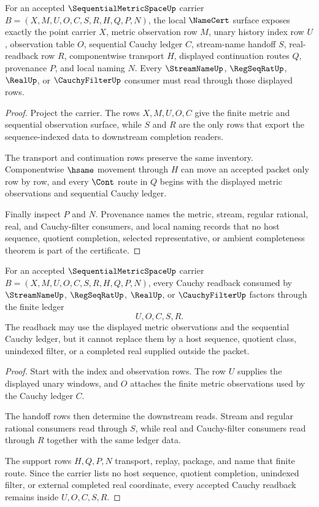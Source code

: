 \begin{theorem}
\label{thm:sequential-metric-space-namecert-obligations}
For an accepted $\SequentialMetricSpaceUp$ carrier $B=(X,M,U,O,C,S,R,H,Q,P,N)$, the local $\NameCert$ surface exposes exactly the point carrier $X$, metric observation row $M$, unary history index row $U$, observation table $O$, sequential Cauchy ledger $C$, stream-name handoff $S$, real-readback row $R$, componentwise transport $H$, displayed continuation routes $Q$, provenance $P$, and local naming $N$. Every $\StreamNameUp$, $\RegSeqRatUp$, $\RealUp$, or $\CauchyFilterUp$ consumer must read through those displayed rows.
\end{theorem}
\begin{proof}
Project the carrier. The rows $X,M,U,O,C$ give the finite metric and sequential observation surface, while $S$ and $R$ are the only rows that export the sequence-indexed data to downstream completion readers.

The transport and continuation rows preserve the same inventory. Componentwise $\hsame$ movement through $H$ can move an accepted packet only row by row, and every $\Cont$ route in $Q$ begins with the displayed metric observations and sequential Cauchy ledger.

Finally inspect $P$ and $N$. Provenance names the metric, stream, regular rational, real, and Cauchy-filter consumers, and local naming records that no host sequence, quotient completion, selected representative, or ambient completeness theorem is part of the certificate.
\end{proof}

\begin{theorem}
\label{thm:sequential-metric-space-cauchy-readback}
For an accepted $\SequentialMetricSpaceUp$ carrier $B=(X,M,U,O,C,S,R,H,Q,P,N)$, every Cauchy readback consumed by $\StreamNameUp$, $\RegSeqRatUp$, $\RealUp$, or $\CauchyFilterUp$ factors through the finite ledger
$$
U,O,C,S,R.
$$
The readback may use the displayed metric observations and the sequential Cauchy ledger, but it cannot replace them by a host sequence, quotient class, unindexed filter, or a completed real supplied outside the packet.
\end{theorem}
\begin{proof}
Start with the index and observation rows. The row $U$ supplies the displayed unary windows, and $O$ attaches the finite metric observations used by the Cauchy ledger $C$.

The handoff rows then determine the downstream reads. Stream and regular rational consumers read through $S$, while real and Cauchy-filter consumers read through $R$ together with the same ledger data.

The support rows $H,Q,P,N$ transport, replay, package, and name that finite route. Since the carrier lists no host sequence, quotient completion, unindexed filter, or external completed real coordinate, every accepted Cauchy readback remains inside $U,O,C,S,R$.
\end{proof}

